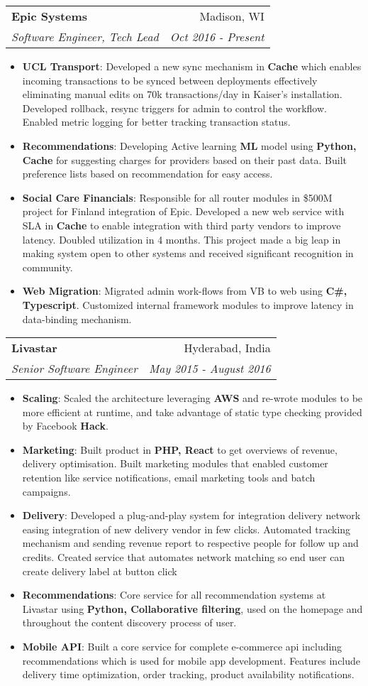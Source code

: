 \documentclass[letterpaper,11pt]{article}
\makeatletter
\newcommand{\resumeItem}[2]{
  \item\small{
    \textbf{#1}{: #2 \vspace{-5pt}}
  }
}
\newcommand{\resumeSubheading}[4]{
  \vspace{-1pt}\item
    \begin{tabular*}{0.97\textwidth}{l@{\extracolsep{\fill}}r}
      \textbf{#1} & #2 \\
      \textit{\small#3} & \textit{\small #4} \\
    \end{tabular*}\vspace{-10pt}
}
\newcommand{\resumeItemListStart}{\begin{itemize}}
\newcommand{\resumeItemListEnd}{\end{itemize}\vspace{-5pt}}
\makeatother
\begin{document}
    \resumeSubheading
      {Epic Systems}{Madison, WI}
      {Software Engineer, Tech Lead}{Oct 2016 - Present}
      \resumeItemListStart
        \resumeItem{UCL Transport}
          {Developed a new sync mechanism in \textbf{Cache} which enables incoming transactions to be synced between deployments effectively eliminating manual edits on 70k transactions/day in Kaiser's installation. Developed rollback, resync triggers for admin to control the workflow. Enabled metric logging for better tracking transaction status.}
        \resumeItem{Recommendations}
          {Developing Active learning \textbf{ML} model using \textbf{Python, Cache} for suggesting charges for providers based on their past data. Built preference lists based on recommendation for easy access.}
        \resumeItem{Social Care Financials}
          {Responsible for all router modules in \$500M project for Finland integration of Epic. Developed a new web service with SLA in \textbf{Cache} to enable integration with third party vendors to improve latency. Doubled utilization in 4 months. This project made a big leap in making system open to other systems and received significant recognition in community.}
        \resumeItem{Web Migration}
          {Migrated admin work-flows from VB to web using \textbf{C\#, Typescript}. Customized internal framework modules to improve latency in data-binding mechanism.}
      \resumeItemListEnd

    \resumeSubheading
      {Livastar}{Hyderabad, India}
      {Senior Software Engineer}{May 2015 - August 2016}
      \resumeItemListStart
        \resumeItem{Scaling}
          {Scaled the architecture leveraging \textbf{AWS} and re-wrote modules to be more efficient at runtime, and take advantage of static type checking provided by Facebook \textbf{Hack}.}
      \resumeItem{Marketing}
          {Built product in \textbf{PHP, React} to get overviews of revenue, delivery optimisation. 
          Built marketing modules that enabled customer retention like service notifications, email marketing tools and batch campaigns.}
        \resumeItem{Delivery}
            {Developed a plug-and-play system for integration delivery network easing integration of new delivery vendor in few clicks. Automated tracking mechanism and sending revenue report to respective people for follow up and credits. Created service that automates network matching so end user can create delivery label at button click}
        \resumeItem{Recommendations}
          {Core service for all recommendation systems at Livastar using \textbf{Python, Collaborative filtering}, used on the homepage and throughout the content discovery process of user.}
        \resumeItem{Mobile API}
          {Built a core service for complete e-commerce api including recommendations which is used for mobile app development. Features include delivery time optimization, order tracking, product availability notifications.}
      \resumeItemListEnd
\end{document}
